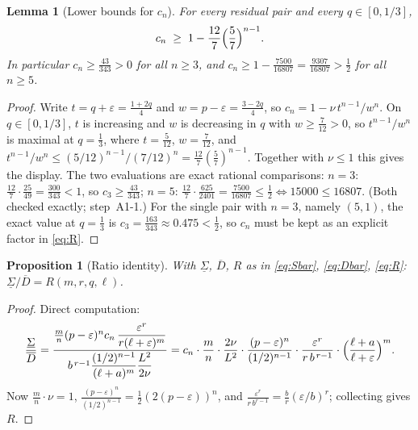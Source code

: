 \documentclass[11pt]{amsart}
\newtheorem{lemma}[theorem]{Lemma}
\newtheorem{proposition}[theorem]{Proposition}
\theoremstyle{remark}
\begin{document}
\begin{lemma}[Lower bounds for $c_n$]\label{lem:cn}
For every residual pair and every $q\in[0,1/3]$,
\[
        c_n\;\ge\;1-\frac{12}{7}\Bigl(\frac57\Bigr)^{n-1}.
\]
In particular $c_n\ge\frac{43}{343}>0$ for all $n\ge3$, and $c_n\ge1-\frac{7500}{16807}=\frac{9307}{16807}>\frac12$ for all $n\ge5$.
\end{lemma}

\begin{proof}
Write $t=q+\varepsilon=\frac{1+2q}{4}$ and $w=p-\varepsilon=\frac{3-2q}{4}$, so $c_n=1-\nu\,t^{n-1}/w^{n}$.  On $q\in[0,1/3]$, $t$ is increasing and $w$ is decreasing in $q$ with $w\ge\tfrac7{12}>0$, so $t^{n-1}/w^{n}$ is maximal at $q=\tfrac13$, where $t=\tfrac5{12}$, $w=\tfrac7{12}$, and
$t^{n-1}/w^{n}\le(5/12)^{n-1}/(7/12)^{n}=\frac{12}{7}(\frac57)^{n-1}$.
Together with $\nu\le1$ this gives the display.  The two evaluations are exact rational comparisons:
$n=3$: $\frac{12}{7}\cdot\frac{25}{49}=\frac{300}{343}<1$, so $c_3\ge\frac{43}{343}$;
$n=5$: $\frac{12}{7}\cdot\frac{625}{2401}=\frac{7500}{16807}\le\frac12\iff15000\le16807$.
(Both checked exactly; step~A1-1.)  For the single pair with $n=3$, namely $(5,1)$, the exact value at $q=\tfrac13$ is $c_3=\tfrac{163}{343}\approx0.475<\tfrac12$, so $c_n$ must be kept as an explicit factor in \eqref{eq:R}.
\end{proof}

\begin{proposition}[Ratio identity]\label{prop:ratio}
With $\underline\Sigma$, $\overline D$, $R$ as in \eqref{eq:Sbar}, \eqref{eq:Dbar}, \eqref{eq:R}: $\underline\Sigma/\overline D=R(m,r,q,\ell)$.
\end{proposition}

\begin{proof}
Direct computation:
\[
        \frac{\underline\Sigma}{\overline D}
        =\frac{\frac mn(p-\varepsilon)^{n}c_n\,\dfrac{\varepsilon^{r}}{r(\ell+\varepsilon)^{m}}}
              {b^{\,r-1}\dfrac{(1/2)^{n-1}}{(\ell+a)^{m}}\dfrac{L^{2}}{2\nu}}
        =c_n\cdot\frac mn\cdot\frac{2\nu}{L^{2}}\cdot
         \frac{(p-\varepsilon)^{n}}{(1/2)^{n-1}}\cdot
         \frac{\varepsilon^{r}}{r\,b^{\,r-1}}\cdot
         \Bigl(\frac{\ell+a}{\ell+\varepsilon}\Bigr)^{m}.
\]
Now $\frac mn\cdot\nu=1$, $\frac{(p-\varepsilon)^n}{(1/2)^{n-1}}=\tfrac12(2(p-\varepsilon))^n$, and $\frac{\varepsilon^r}{r\,b^{r-1}}=\frac br(\varepsilon/b)^r$; collecting gives $R$.
\end{proof}
\end{document}
